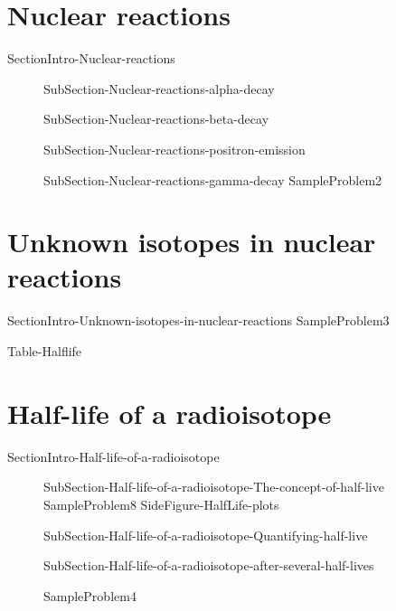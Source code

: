 \documentclass[main.tex]{subfiles}
\begin{document}
\section{Nuclear reactions}{SectionIntro-Nuclear-reactions}
\sloppy \begin{description}
\item[] {SubSection-Nuclear-reactions-alpha-decay}
\item[] {SubSection-Nuclear-reactions-beta-decay}
\item[] {SubSection-Nuclear-reactions-positron-emission}
\item[] {SubSection-Nuclear-reactions-gamma-decay}
  {SampleProblem2}
\end{description}

\section{Unknown isotopes in nuclear reactions}
{SectionIntro-Unknown-isotopes-in-nuclear-reactions}
  {SampleProblem3}
\begin{fullwidth}{Table-Halflife}\end{fullwidth}


 

\section{Half-life of a radioisotope}{SectionIntro-Half-life-of-a-radioisotope}
\sloppy \begin{description}
\item[]{SubSection-Half-life-of-a-radioisotope-The-concept-of-half-live}
  {SampleProblem8}
  {SideFigure-HalfLife-plots}
  \item[]{SubSection-Half-life-of-a-radioisotope-Quantifying-half-live}
\item[] {SubSection-Half-life-of-a-radioisotope-after-several-half-lives}

\renewcommand{\tikzmark}[3][]{\tikz[overlay,remember picture,baseline] \node [anchor=base,#1](#2) {#3};}



{SampleProblem4}
\end{description}
\end{document}
